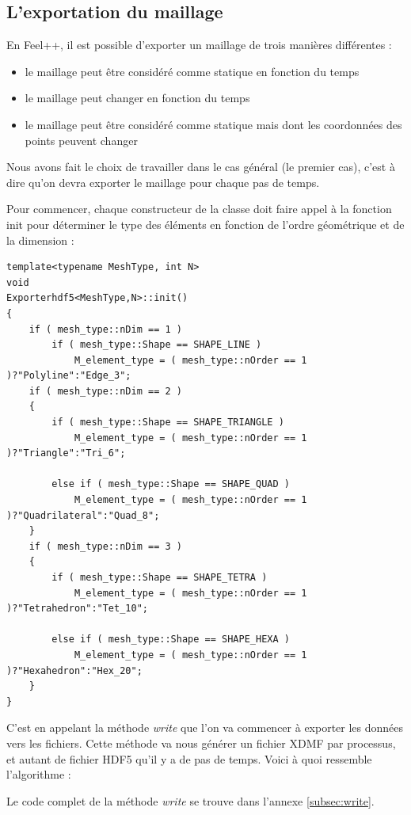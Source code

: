 \documentclass[12pt]{article}
\begin{document}
\subsection{L'exportation du maillage}
\label{subsec:exportation}
En Feel++, il est possible d'exporter un maillage de trois manières différentes :
\begin{itemize}
\item le maillage peut être considéré comme statique en fonction du temps
\item le maillage peut changer en fonction du temps
\item le maillage peut être considéré comme statique mais dont les coordonnées des points peuvent changer 
\end{itemize}
Nous avons fait le choix de travailler dans le cas général (le premier cas), c'est à dire qu'on devra exporter le maillage pour chaque pas de temps.\newline

Pour commencer, chaque constructeur de la classe doit faire appel à la fonction init pour déterminer le type des éléments en fonction de l'ordre géométrique et de la dimension :
\begin{lstlisting}
template<typename MeshType, int N>
void
Exporterhdf5<MeshType,N>::init()
{
    if ( mesh_type::nDim == 1 )
        if ( mesh_type::Shape == SHAPE_LINE )
            M_element_type = ( mesh_type::nOrder == 1 )?"Polyline":"Edge_3";
    if ( mesh_type::nDim == 2 )
    {
        if ( mesh_type::Shape == SHAPE_TRIANGLE )
            M_element_type = ( mesh_type::nOrder == 1 )?"Triangle":"Tri_6";

        else if ( mesh_type::Shape == SHAPE_QUAD )
            M_element_type = ( mesh_type::nOrder == 1 )?"Quadrilateral":"Quad_8";
    }
    if ( mesh_type::nDim == 3 )
    {
        if ( mesh_type::Shape == SHAPE_TETRA )
            M_element_type = ( mesh_type::nOrder == 1 )?"Tetrahedron":"Tet_10";

        else if ( mesh_type::Shape == SHAPE_HEXA )
            M_element_type = ( mesh_type::nOrder == 1 )?"Hexahedron":"Hex_20";
    }
}
\end{lstlisting}
C'est en appelant la méthode \emph{write} que l'on va commencer à exporter les données vers les fichiers. Cette méthode va nous générer un fichier XDMF par processus, et autant de fichier HDF5 qu'il y a de pas de temps. Voici à quoi ressemble l'algorithme :



Le code complet de la méthode \emph{write} se trouve dans l'annexe \ref{subsec:write}.
\end{document}
